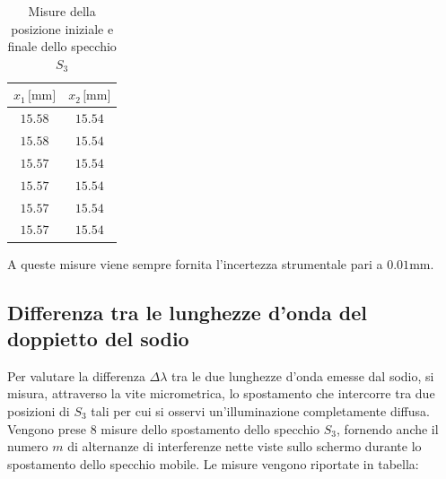 \documentclass[]{article}
\let\oldsubsection\subsection%
\renewcommand{\subsection}{%
	\renewcommand{\theequation}{\thesubsection.\arabic{equation}}%
	\oldsubsection}%
\begin{document}
\begin{table}[H]
    \centering

    \begin{tabular}{||c|c||}
        \hline
        $x_1 \, \text{[mm]}$ & $x_2\, \text{[mm]}$ \\
        \hline\hline

        $15.58$ & $15.54$ \\\hline
        $15.58$ & $15.54$ \\\hline
        $15.57$ & $15.54$ \\\hline
        $15.57$ & $15.54$ \\\hline
        $15.57$ & $15.54$ \\\hline
        $15.57$ & $15.54$ \\\hline
    
    \end{tabular}
    \caption{Misure della posizione iniziale e finale dello specchio $S_3$}
    \label{L}    
\end{table}
A queste misure viene sempre fornita l'incertezza strumentale pari a $0.01\text{mm}$.

\subsection{Differenza tra le lunghezze d'onda del doppietto del sodio}

Per valutare la differenza $\Delta \lambda$ tra le due lunghezze d'onda emesse dal sodio, si misura, attraverso la vite micrometrica, lo spostamento che intercorre tra due posizioni di $S_3$ tali per cui si osservi un'illuminazione completamente diffusa. Vengono prese 8 misure dello spostamento dello specchio $S_3$, fornendo anche il numero $m$ di alternanze di interferenze nette viste sullo schermo durante lo spostamento dello specchio mobile. Le misure vengono riportate in tabella:
\end{document}
